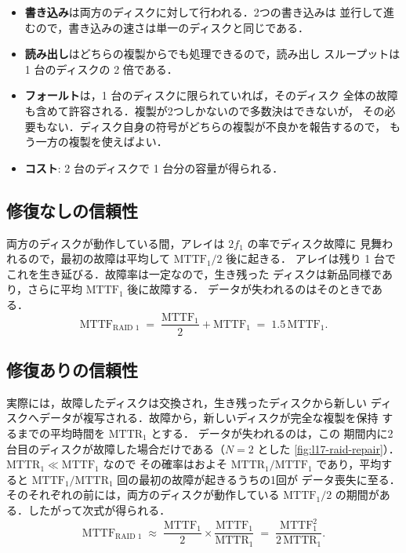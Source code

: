 \documentclass[../main.tex]{subfiles}
\begin{document}
\begin{itemize}
  \item \textbf{書き込み}は両方のディスクに対して行われる．2つの書き込みは
    並行して進むので，書き込みの速さは単一のディスクと同じである．
  \item \textbf{読み出し}はどちらの複製からでも処理できるので，読み出し
    スループットは 1 台のディスクの 2 倍である．
  \item \textbf{フォールト}は，1 台のディスクに限られていれば，そのディスク
    全体の故障も含めて許容される．複製が2つしかないので多数決はできないが，
    その必要もない．ディスク自身の符号がどちらの複製が不良かを報告するので，
    もう一方の複製を使えばよい．
  \item \textbf{コスト}: 2 台のディスクで 1 台分の容量が得られる．
\end{itemize}

\subsection{修復なしの信頼性}

両方のディスクが動作している間，アレイは $2f_1$ の率でディスク故障に
見舞われるので，最初の故障は平均して $\mathrm{MTTF}_1/2$ 後に起きる．
アレイは残り 1 台でこれを生き延びる．故障率は一定なので，生き残った
ディスクは新品同様であり，さらに平均 $\mathrm{MTTF}_1$ 後に故障する．
データが失われるのはそのときである．
\begin{equation}
  \mathrm{MTTF}_{\text{RAID 1}} \;=\; \frac{\mathrm{MTTF}_1}{2} + \mathrm{MTTF}_1
  \;=\; 1.5\,\mathrm{MTTF}_1 .
  \label{eq:l17-raid1-norepair}
\end{equation}

\subsection{修復ありの信頼性}

実際には，故障したディスクは交換され，生き残ったディスクから新しい
ディスクへデータが複写される．故障から，新しいディスクが完全な複製を保持
するまでの平均時間を $\mathrm{MTTR}_1$ とする．%
データが失われるのは，この
期間内に2台目のディスクが故障した場合だけである（$N=2$ とした
\cref{fig:l17-raid-repair}）．$\mathrm{MTTR}_1 \ll \mathrm{MTTF}_1$ なので
その確率はおよそ $\mathrm{MTTR}_1/\mathrm{MTTF}_1$ であり，平均すると
$\mathrm{MTTF}_1/\mathrm{MTTR}_1$ 回の最初の故障が起きるうちの1回が
データ喪失に至る．そのそれぞれの前には，両方のディスクが動作している
$\mathrm{MTTF}_1/2$ の期間がある．したがって次式が得られる．
\begin{equation}
  \mathrm{MTTF}_{\text{RAID 1}} \;\approx\;
  \frac{\mathrm{MTTF}_1}{2} \times \frac{\mathrm{MTTF}_1}{\mathrm{MTTR}_1}
  \;=\; \frac{\mathrm{MTTF}_1^2}{2\,\mathrm{MTTR}_1} .
  \label{eq:l17-raid1-repair}
\end{equation}
\end{document}
